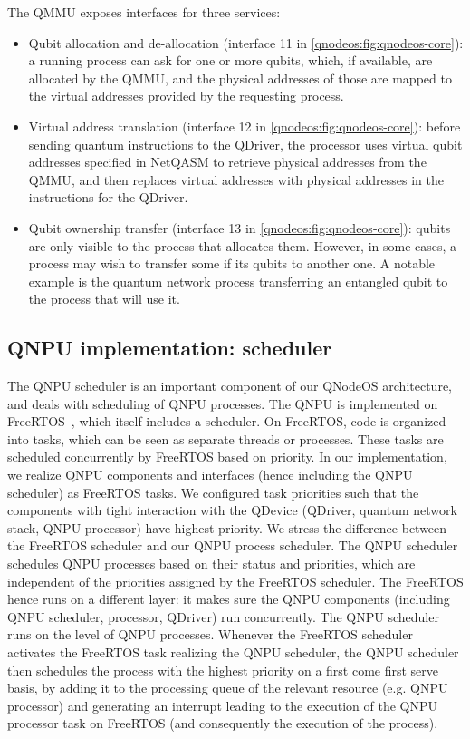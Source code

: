 The \ac{QMMU} exposes interfaces for three services:
%
\begin{itemize}
\item Qubit allocation and de-allocation (interface 11 in \cref{qnodeos:fig:qnodeos-core}): a running process can ask for one or more qubits, which, if available, are allocated by the \ac{QMMU}, and the physical addresses of those are mapped to the virtual addresses provided by the requesting process.
\item Virtual address translation (interface 12 in \cref{qnodeos:fig:qnodeos-core}): before sending quantum instructions to the \ac{QDriver}, the processor uses virtual qubit addresses specified in \ac{NetQASM} to retrieve physical addresses from the \ac{QMMU}, and then replaces virtual addresses with physical addresses in the instructions for the \ac{QDriver}.
\item Qubit ownership transfer (interface 13 in \cref{qnodeos:fig:qnodeos-core}): qubits are only visible to the process that allocates them. However, in some cases, a process may wish to transfer some if its qubits to another one. A notable example is the quantum network process transferring an entangled qubit to the process that will use it.
\end{itemize}

\subsection{QNPU implementation: scheduler}
\label{qnodeos:sec:qnpu_impl_scheduler}
The \ac{QNPU} scheduler is an important component of our \ac{QNodeOS} architecture, and deals with scheduling of QNPU processes. The QNPU is implemented on FreeRTOS~\cite{freertos}, which itself includes a scheduler. On FreeRTOS, code is organized into tasks, which can be seen as separate threads or processes. These tasks are scheduled concurrently by FreeRTOS based on priority. In our implementation, we realize QNPU components and interfaces (hence including the QNPU scheduler) as FreeRTOS tasks. We configured task priorities such that the components with tight interaction with the QDevice (\ac{QDriver}, quantum network stack, QNPU processor) have highest priority.
We stress the difference between the FreeRTOS scheduler and our QNPU process scheduler. 
The QNPU scheduler schedules QNPU processes based on their status and priorities, which are independent of the priorities assigned by the FreeRTOS scheduler.
The FreeRTOS hence runs on a different layer: it makes sure the QNPU components (including QNPU scheduler, processor, \ac{QDriver}) run concurrently. The QNPU scheduler runs on the level of QNPU processes. Whenever the FreeRTOS scheduler activates the FreeRTOS task realizing the QNPU scheduler, the QNPU scheduler then schedules the process with the highest priority on a first come first serve basis, by adding it to the processing queue of the relevant resource (e.g. QNPU processor) and generating an interrupt leading to the execution of the QNPU processor task on FreeRTOS (and consequently the execution of the process).

